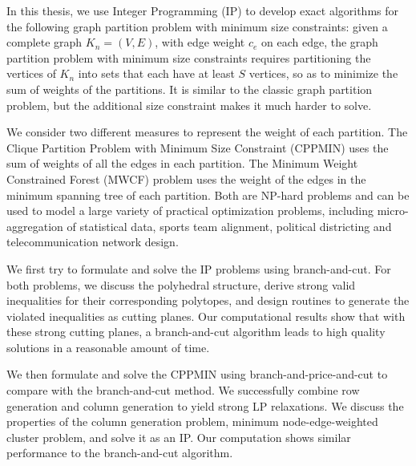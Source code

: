 \documentclass{article}
\begin{document}
In this thesis, we use Integer Programming (IP) to develop exact algorithms for the following graph partition problem with minimum size constraints: given a complete graph $K_n = (V, E)$, with edge weight $c_e$ on each edge, the graph partition problem with minimum size constraints requires partitioning the vertices of $K_n$ into sets that each have at least $S$ vertices, so as to minimize the sum of weights of the partitions. It is similar to the classic graph partition problem, but the additional size constraint makes it much harder to solve.

We consider two different measures to represent the weight of each partition. The Clique Partition Problem with Minimum Size Constraint (CPPMIN) uses the sum of weights of all the edges in each partition. The Minimum Weight Constrained Forest (MWCF) problem uses the weight of the edges in the minimum spanning tree of each partition. Both are NP-hard problems and can be used to model a large variety of practical optimization problems, including micro-aggregation of statistical data, sports team alignment, political districting and telecommunication network design.

We first try to formulate and solve the IP problems using branch-and-cut. For both problems, we discuss the polyhedral structure, derive strong valid inequalities for their corresponding polytopes, and design routines to generate the violated inequalities as cutting planes. Our computational results show that with these strong cutting planes, a branch-and-cut algorithm leads to high quality solutions in a reasonable amount of time.

We then formulate and solve the CPPMIN using branch-and-price-and-cut to compare with the branch-and-cut method. We successfully combine row generation and column generation to yield strong LP relaxations. We discuss the properties of the column generation problem, minimum node-edge-weighted cluster problem, and solve it as an IP. Our computation shows similar performance to the branch-and-cut algorithm.
\end{document}
